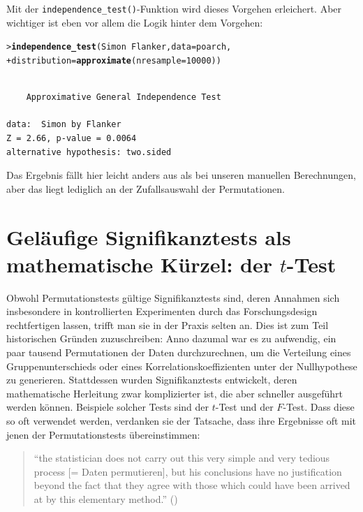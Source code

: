 \documentclass[oneside, 10pt]{book}\usepackage[]{graphicx}\usepackage[]{xcolor}
\makeatletter
\newcommand{\hlnum}[1]{\textcolor[rgb]{0.686,0.059,0.569}{#1}}%
\newcommand{\hlopt}[1]{\textcolor[rgb]{0,0,0}{#1}}%
\newcommand{\hlstd}[1]{\textcolor[rgb]{0.345,0.345,0.345}{#1}}%
\newcommand{\hlkwc}[1]{\textcolor[rgb]{0.333,0.667,0.333}{#1}}%
\newcommand{\hlkwd}[1]{\textcolor[rgb]{0.737,0.353,0.396}{\textbf{#1}}}%
\newenvironment{kframe}{%
 \def\at@end@of@kframe{}%
 \ifinner\ifhmode%
  \def\at@end@of@kframe{\end{minipage}}%
  \begin{minipage}{\columnwidth}%
 \fi\fi%
 \def\FrameCommand##1{\hskip\@totalleftmargin \hskip-\fboxsep
 \colorbox{shadecolor}{##1}\hskip-\fboxsep
     \hskip-\linewidth \hskip-\@totalleftmargin \hskip\columnwidth}%
 \MakeFramed {\advance\hsize-\width
   \@totalleftmargin\z@ \linewidth\hsize
   \@setminipage}}%
 {\par\unskip\endMakeFramed%
 \at@end@of@kframe}
\newenvironment{knitrout}{}{} %
\makeatother
\begin{document}
Mit der \texttt{independence\_test()}-Funktion
wird dieses Vorgehen erleichert. Aber wichtiger
ist eben vor allem die Logik hinter dem Vorgehen:
\begin{knitrout}
\color{fgcolor}\begin{kframe}
\begin{alltt}
\hlstd{> }\hlkwd{independence_test}\hlstd{(Simon} \hlopt{~} \hlstd{Flanker,} \hlkwc{data} \hlstd{= poarch,}
\hlstd{+ }                  \hlkwc{distribution} \hlstd{=} \hlkwd{approximate}\hlstd{(}\hlkwc{nresample} \hlstd{=} \hlnum{10000}\hlstd{))}
\end{alltt}
\begin{verbatim}

	Approximative General Independence Test

data:  Simon by Flanker
Z = 2.66, p-value = 0.0064
alternative hypothesis: two.sided
\end{verbatim}
\end{kframe}
\end{knitrout}

Das Ergebnis fällt hier leicht
anders aus als bei unseren manuellen Berechnungen,
aber das liegt lediglich an der Zufallsauswahl der
Permutationen.

\section{Geläufige Signifikanztests als mathematische Kürzel: der $t$-Test}
Obwohl Permutationstests gültige Signifikanztests
sind, deren Annahmen sich insbesondere in kontrollierten Experimenten
durch das Forschungsdesign rechtfertigen lassen,
trifft man sie in der Praxis selten an.
Dies ist zum Teil historischen Gründen zuzuschreiben:
Anno dazumal war es zu aufwendig, ein paar tausend
Permutationen der Daten durchzurechnen, um
die Verteilung eines Gruppenunterschieds
oder eines Korrelationskoeffizienten unter
der Nullhypothese zu generieren.
Stattdessen wurden Signifikanztests entwickelt,
deren mathematische Herleitung zwar komplizierter
ist, die aber schneller ausgeführt werden können.
Beispiele solcher Tests sind der $t$-Test und
der $F$-Test. Dass diese so oft verwendet werden,
verdanken sie der Tatsache, dass ihre Ergebnisse oft mit
jenen der Permutationstests übereinstimmen:
\begin{quote}
``the statistician does not carry out this very
simple and very tedious process [= Daten permutieren],
but his conclusions have no justification beyond the
fact that they agree with those which could have been
arrived at by this elementary method.''
(\citealp{Fisher1936})
\end{quote}
\end{document}
